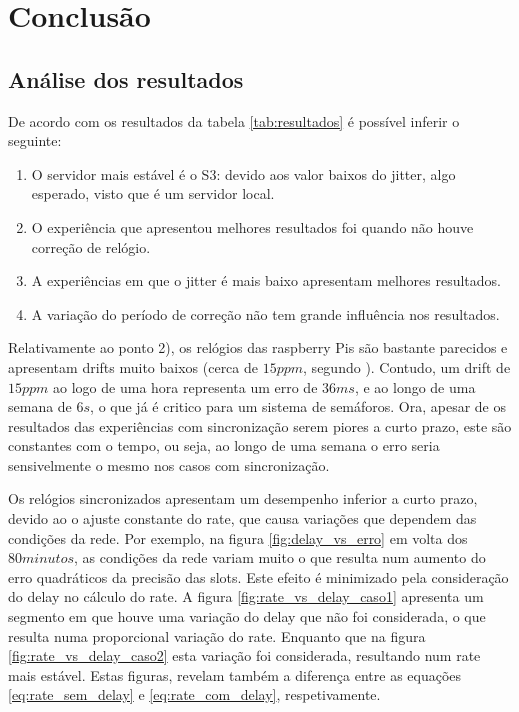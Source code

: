 \section{Conclusão} \label{sec_conclusão}

\subsection{Análise dos resultados}
De acordo com os resultados da tabela \ref{tab:resultados} é possível inferir o seguinte:

\begin{enumerate}
    \item O servidor mais estável é o S3: devido aos valor baixos do jitter, algo esperado, visto que é um servidor local.
    \item O experiência que apresentou melhores resultados foi quando não houve correção de relógio.
    \item A experiências em que o jitter é mais baixo apresentam melhores resultados.
    \item A variação do período de correção não tem grande influência nos resultados.
\end{enumerate}

Relativamente ao ponto 2), os relógios das raspberry Pis são bastante parecidos e apresentam drifts muito baixos (cerca de $15ppm$, segundo \cite{b4}). Contudo, um drift de $15ppm$ ao logo de uma hora representa um erro de $36 ms$, e ao longo de uma semana de $6 s$, o que já é critico para um sistema de semáforos. Ora, apesar de os resultados das experiências com sincronização serem piores a curto prazo, este são constantes com o tempo, ou seja, ao longo de uma semana o erro seria sensivelmente o mesmo nos casos com sincronização. 

Os relógios sincronizados apresentam um desempenho inferior a curto prazo, devido ao o ajuste constante do rate, que causa variações que dependem das condições da rede. Por exemplo, na figura \ref{fig:delay_vs_erro} em volta dos $80 minutos$, as condições da rede variam muito o que resulta num aumento do erro quadráticos da precisão das slots. Este efeito é minimizado pela consideração do delay no cálculo do rate. A figura \ref{fig:rate_vs_delay_caso1} apresenta um segmento em que houve uma variação do delay que não foi considerada, o que resulta numa proporcional variação do rate. Enquanto que na figura \ref{fig:rate_vs_delay_caso2} esta variação foi considerada, resultando num rate mais estável. Estas figuras, revelam também a diferença entre as equações \ref{eq:rate_sem_delay} e \ref{eq:rate_com_delay}, respetivamente.

